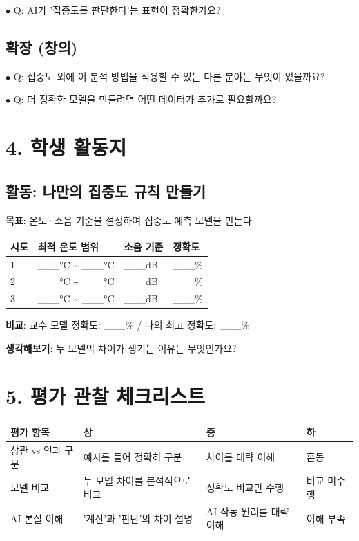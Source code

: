 \documentclass[11pt,a4paper]{article}
\begin{document}
$\bullet$ Q: AI가 '집중도를 판단한다'는 표현이 정확한가요?


\subsection*{확장 (창의)}

$\bullet$ Q: 집중도 외에 이 분석 방법을 적용할 수 있는 다른 분야는 무엇이 있을까요?

$\bullet$ Q: 더 정확한 모델을 만들려면 어떤 데이터가 추가로 필요할까요?



\section*{4. 학생 활동지}

\subsection*{활동: 나만의 집중도 규칙 만들기}

\textbf{목표}: 온도·소음 기준을 설정하여 집중도 예측 모델을 만든다


\begin{center}
\renewcommand{\arraystretch}{1.4}
\begin{tabular}{|p{1.8cm}|p{6.4cm}|p{4.1cm}|p{2.7cm}|}
\hline
\rowcolor{tableheader}
\textbf{시도} & \textbf{최적 온도 범위} & \textbf{소음 기준} & \textbf{정확도} \\
\hline
1 & \_\_\_°C \textasciitilde{} \_\_\_°C & \_\_\_dB & \_\_\_\% \\
\hline
2 & \_\_\_°C \textasciitilde{} \_\_\_°C & \_\_\_dB & \_\_\_\% \\
\hline
3 & \_\_\_°C \textasciitilde{} \_\_\_°C & \_\_\_dB & \_\_\_\% \\
\hline
\end{tabular}
\end{center}

\textbf{비교}: 교수 모델 정확도: \_\_\_\% / 나의 최고 정확도: \_\_\_\%


\textbf{생각해보기}: 두 모델의 차이가 생기는 이유는 무엇인가요?



\section*{5. 평가 관찰 체크리스트}

\begin{center}
\renewcommand{\arraystretch}{1.4}
\begin{tabular}{|p{3.1cm}|p{5.5cm}|p{4.4cm}|p{2.0cm}|}
\hline
\rowcolor{tableheader}
\textbf{평가 항목} & \textbf{상} & \textbf{중} & \textbf{하} \\
\hline
상관 vs 인과 구분 & 예시를 들어 정확히 구분 & 차이를 대략 이해 & 혼동 \\
\hline
모델 비교 & 두 모델 차이를 분석적으로 비교 & 정확도 비교만 수행 & 비교 미수행 \\
\hline
AI 본질 이해 & '계산'과 '판단'의 차이 설명 & AI 작동 원리를 대략 이해 & 이해 부족 \\
\hline
\end{tabular}
\end{center}
\end{document}
